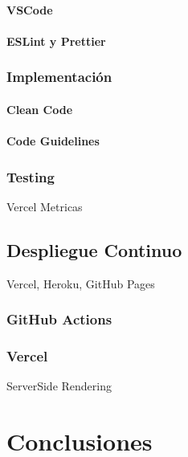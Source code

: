 \documentclass[12pt,twoside,titlepage]{report}
\begin{document}
\subsubsection{VSCode}

\subsubsection{ESLint y Prettier}

\subsection{Implementación}

\subsubsection{Clean Code}

\subsubsection{Code Guidelines}

\subsection{Testing}

Vercel Metricas

\section{Despliegue Continuo}

Vercel, Heroku, GitHub Pages

\subsection{GitHub Actions}

\subsection{Vercel}

ServerSide Rendering


\newpage

\chapter{Conclusiones}
\end{document}

